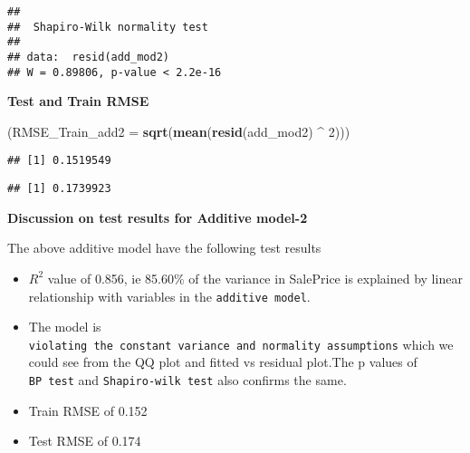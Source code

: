 \documentclass[]{article}
\newenvironment{Shaded}{\begin{snugshade}}{\end{snugshade}}
\newcommand{\KeywordTok}[1]{\textcolor[rgb]{0.13,0.29,0.53}{\textbf{#1}}}
\newcommand{\DataTypeTok}[1]{\textcolor[rgb]{0.13,0.29,0.53}{#1}}
\newcommand{\DecValTok}[1]{\textcolor[rgb]{0.00,0.00,0.81}{#1}}
\newcommand{\StringTok}[1]{\textcolor[rgb]{0.31,0.60,0.02}{#1}}
\newcommand{\OperatorTok}[1]{\textcolor[rgb]{0.81,0.36,0.00}{\textbf{#1}}}
\newcommand{\NormalTok}[1]{#1}
\begin{document}
\begin{verbatim}
## 
##  Shapiro-Wilk normality test
## 
## data:  resid(add_mod2)
## W = 0.89806, p-value < 2.2e-16
\end{verbatim}

\textbf{Test and Train RMSE}

\begin{Shaded}
\begin{Highlighting}[]
\NormalTok{ (}\DataTypeTok{RMSE_Train_add2 =} \KeywordTok{sqrt}\NormalTok{(}\KeywordTok{mean}\NormalTok{(}\KeywordTok{resid}\NormalTok{(add_mod2) }\OperatorTok{^}\StringTok{ }\DecValTok{2}\NormalTok{)))}
\end{Highlighting}
\end{Shaded}

\begin{verbatim}
## [1] 0.1519549
\end{verbatim}

\begin{Shaded}
\end{Shaded}

\begin{verbatim}
## [1] 0.1739923
\end{verbatim}

\textbf{Discussion on test results for Additive model-2}

The above additive model have the following test results

\begin{itemize}
\item
  \(R^2\) value of 0.856, ie 85.60\% of the variance in SalePrice is
  explained by linear relationship with variables in the
  \texttt{additive\ model}.
\item
  The model is
  \texttt{violating\ the\ constant\ variance\ and\ normality\ assumptions}
  which we could see from the QQ plot and fitted vs residual plot.The p
  values of \texttt{BP\ test} and \texttt{Shapiro-wilk\ test} also
  confirms the same.
\item
  Train RMSE of 0.152
\item
  Test RMSE of 0.174
\end{itemize}
\end{document}
